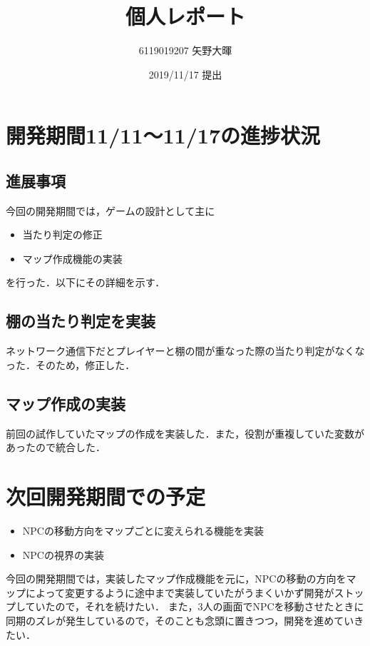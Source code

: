 \documentclass{jarticle}
\title{個人レポート}
\author{6119019207 矢野大暉}
\date{2019/11/17 提出}
\begin{document}
\maketitle

\section{開発期間11/11～11/17の進捗状況} 
\subsection{進展事項}
今回の開発期間では，ゲームの設計として主に
\begin{itemize}
\item 当たり判定の修正
\item マップ作成機能の実装
\end{itemize}
を行った．以下にその詳細を示す．


\subsection{棚の当たり判定を実装}
ネットワーク通信下だとプレイヤーと棚の間が重なった際の当たり判定がなくなった．そのため，修正した．

\subsection{マップ作成の実装}
前回の試作していたマップの作成を実装した．また，役割が重複していた変数があったので統合した．

\section{次回開発期間での予定}
\begin{itemize}
\item NPCの移動方向をマップごとに変えられる機能を実装
\item NPCの視界の実装
\end{itemize}

今回の開発期間では，実装したマップ作成機能を元に，NPCの移動の方向をマップによって変更するように途中まで実装していたがうまくいかず開発がストップしていたので，それを続けたい．
また，3人の画面でNPCを移動させたときに同期のズレが発生しているので，そのことも念頭に置きつつ，開発を進めていきたい．
\end{document}
